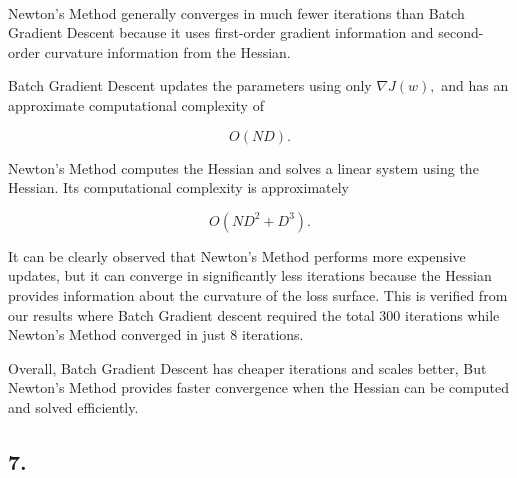 \documentclass[11pt]{article}
\begin{document}
    \begin{center}
    \end{center}
    { \hspace*{\fill} \\}
    
    Newton's Method generally converges in much fewer iterations than Batch
Gradient Descent because it uses first-order gradient information and
second-order curvature information from the Hessian.

Batch Gradient Descent updates the parameters using only
\(\nabla J(w),\) and has an approximate computational complexity of

\[O(ND).\]

Newton's Method computes the Hessian and solves a linear system using
the Hessian. Its computational complexity is approximately

\[O(ND^2+D^3).\]

It can be clearly observed that Newton's Method performs more expensive
updates, but it can converge in significantly less iterations because
the Hessian provides information about the curvature of the loss
surface. This is verified from our results where Batch Gradient descent
required the total 300 iterations while Newton's Method converged in
just 8 iterations.

Overall, Batch Gradient Descent has cheaper iterations and scales
better, But Newton's Method provides faster convergence when the Hessian
can be computed and solved efficiently.

    \subsection{7.}
\end{document}
